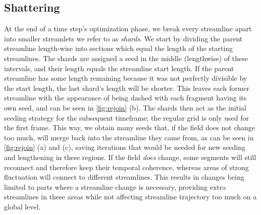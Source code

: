 \subsection{Shattering}
At the end of a time step's optimization phase, we break every streamline apart into smaller streamlets we refer to as \textit{shards}.
We start by dividing the parent streamline length-wise into sections which equal the length of the starting streamlines.
The shards are assigned a seed in the middle (lengthwise) of these intervals,
and their length equals the streamline start length.
If the parent streamline has some length remaining because it was not perfectly divisible by the start length, the last shard's length will be shorter.
This leaves each former streamline with the appearance of being dashed with each fragment having its own seed, and can be seen in \cref{fig:rejoin} (b).
The shards then act as the initial seeding strategy for the subsequent timeframe; the regular grid is only used for the first frame.
This way, we obtain many seeds that, if the field does not change too much, will merge back into the streamline they came from, as can be seen in \cref{fig:rejoin} (a) and (c),
saving iterations that would be needed for new seeding and lengthening in these regions.
If the field \textit{does} change, some segments will still reconnect and therefore keep their temporal coherence,
whereas areas of strong fluctuation will connect to different streamlines.
This results in changes being limited to parts where a streamline change is necessary,
providing extra streamlines in these areas while not affecting streamline trajectory too much on a global level.
\newpage


